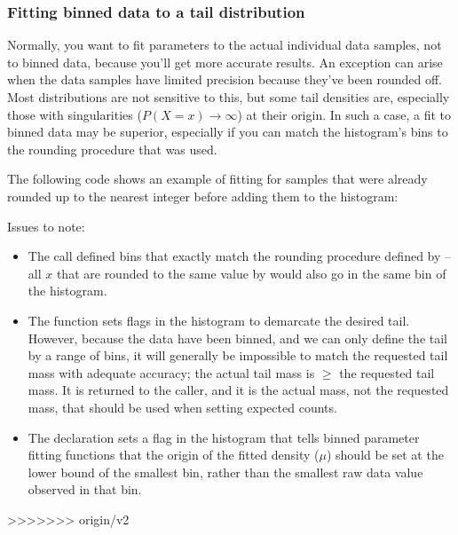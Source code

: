 

\subsubsection{Fitting binned data to a tail distribution}

Normally, you want to fit parameters to the actual individual data
samples, not to binned data, because you'll get more accurate results.
An exception can arise when the data samples have limited precision
because they've been rounded off. Most distributions are not sensitive
to this, but some tail densities are, especially those with
singularities ($P(X=x) \rightarrow \infty$) at their origin. In such a
case, a fit to binned data may be superior, especially if you can
match the histogram's bins to the rounding procedure that was used.

The following code shows an example of fitting for samples that were
already rounded up to the nearest integer before adding them to the
histogram:



Issues to note:

\begin{itemize}
\item The  call
      defined bins that exactly match the rounding procedure
      defined by  -- all $x$ that are rounded
      to the same value by  would also go in
      the same bin of the histogram.

\item The  function sets flags
      in the histogram to demarcate the desired tail.  However,
      because the data have been binned, and we can only define the
      tail by a range of bins, it will generally be impossible to
      match the requested tail mass with adequate accuracy; the actual
      tail mass is $\geq$ the requested tail mass. It is returned
      to the caller, and it is the actual mass, not the requested mass,
      that should be used when setting expected counts.

\item The  declaration
      sets a flag in the histogram that tells binned parameter
      fitting functions that the origin of the fitted
      density ($\mu$) should be set at the lower bound of the smallest bin,
      rather than the smallest raw data value observed in that 
      bin. 
\end{itemize}


>>>>>>> origin/v2
